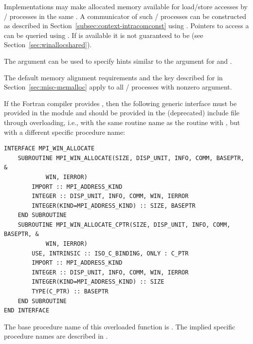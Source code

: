 Implementations may make allocated memory available for load/store accesses
by \MPI/ processes in the same .
A communicator of such \MPI/ processes can be constructed as described in Section~\ref{subsec:context-intracomconst} using .
Pointers to access a  can be queried
using .
If  is available
it is not guaranteed to be  (see Section~\ref{sec:winallocshared}).

The  argument can be used to specify hints
similar to the  argument for  and
.

The default memory alignment requirements and the
  key described
for  in Section~\ref{sec:misc-memalloc} apply to
all \mpi/ processes with nonzero  argument.
 
If the Fortran compiler provides , 
then the following generic interface must be provided in the 
module and should be provided in the (deprecated)  include file through overloading, 
i.e., with the same routine name as the
routine with  ,
but with a different specific procedure name:
 
\begin{verbatim}
INTERFACE MPI_WIN_ALLOCATE
    SUBROUTINE MPI_WIN_ALLOCATE(SIZE, DISP_UNIT, INFO, COMM, BASEPTR, &
            WIN, IERROR)
        IMPORT :: MPI_ADDRESS_KIND
        INTEGER :: DISP_UNIT, INFO, COMM, WIN, IERROR
        INTEGER(KIND=MPI_ADDRESS_KIND) :: SIZE, BASEPTR
    END SUBROUTINE
    SUBROUTINE MPI_WIN_ALLOCATE_CPTR(SIZE, DISP_UNIT, INFO, COMM, BASEPTR, &
            WIN, IERROR)
        USE, INTRINSIC :: ISO_C_BINDING, ONLY : C_PTR
        IMPORT :: MPI_ADDRESS_KIND
        INTEGER :: DISP_UNIT, INFO, COMM, WIN, IERROR
        INTEGER(KIND=MPI_ADDRESS_KIND) :: SIZE
        TYPE(C_PTR) :: BASEPTR
    END SUBROUTINE
END INTERFACE
\end{verbatim}

 
The base procedure name of this overloaded function is
. The implied specific procedure
names
are described in .

